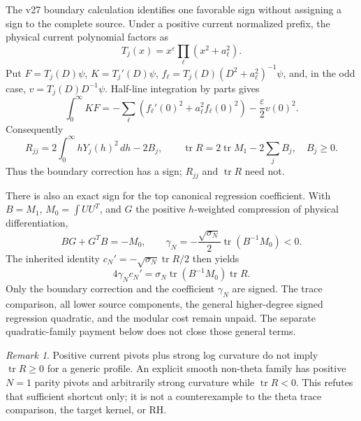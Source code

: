 \documentclass[11pt]{article}
\theoremstyle{definition}
\theoremstyle{remark}
\newtheorem{remark}[theorem]{Remark}
\begin{document}
The v27 boundary calculation identifies one favorable sign without assigning a
sign to the complete source. Under a positive current normalized prefix, the
physical current polynomial factors as
\begin{equation}
 T_j(x)=x^\varepsilon\prod_\ell(x^2+a_\ell^2).
\end{equation}
Put $F=T_j(D)\psi$, $K=T_j'(D)\psi$,
$f_\ell=T_j(D)(D^2+a_\ell^2)^{-1}\psi$, and, in the odd case,
$v=T_j(D)D^{-1}\psi$. Half-line integration by parts gives
\begin{equation}
 \int_0^\infty KF
 =-\sum_\ell\left(f_\ell'(0)^2+a_\ell^2f_\ell(0)^2\right)
  -\frac{\varepsilon}{2}v(0)^2.
 \label{eq:boundary-squares}
\end{equation}
Consequently
\begin{equation}
 R_{jj}=2\int_0^\infty hY_j(h)^2\,dh-2B_j,
 \qquad
 \operatorname{tr}R=2\operatorname{tr}M_1-2\sum_jB_j,
 \quad B_j\ge0.
 \label{eq:trace-boundary}
\end{equation}
Thus the boundary correction has a sign; $R_{jj}$ and
$\operatorname{tr}R$ need not.

There is also an exact sign for the top canonical regression coefficient. With
$B=M_1$, $M_0=\int UU^T$, and $G$ the positive $h$-weighted compression of
physical differentiation,
\begin{equation}
 BG+G^TB=-M_0,
 \qquad
 \gamma_N=-\frac{\sqrt{\sigma_N}}2
             \operatorname{tr}(B^{-1}M_0)<0.
 \label{eq:top-regression}
\end{equation}
The inherited identity
$c_N'=-\sqrt{\sigma_N}\operatorname{tr}R/2$ then yields
\begin{equation}
 4\gamma_Nc_N'
 =\sigma_N\operatorname{tr}(B^{-1}M_0)\operatorname{tr}R.
 \label{eq:top-trace-payment}
\end{equation}
Only the boundary correction and the coefficient $\gamma_N$ are signed. The
trace comparison, all lower source components, the general higher-degree
signed regression quadratic, and the modular cost remain unpaid. The separate
quadratic-family payment below does not close those general terms.

\begin{remark}
Positive current pivots plus strong log curvature do not imply
$\operatorname{tr}R\ge0$ for a generic profile. An explicit smooth non-theta
family has positive $N=1$ parity pivots and arbitrarily strong curvature while
$\operatorname{tr}R<0$. This refutes that sufficient shortcut only; it is not a
counterexample to the theta trace comparison, the target kernel, or RH.
\end{remark}
\end{document}
